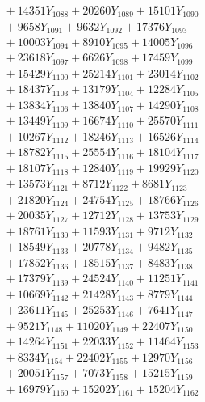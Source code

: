 \documentclass[a4paper,10pt]{article}
\begin{document}
{\begin{align}
&\;  + 14351 Y_{1088} + 20260 Y_{1089} + 15101 Y_{1090} \\[0.3ex]
&\;  + 9658 Y_{1091} + 9632 Y_{1092} + 17376 Y_{1093} \\[0.3ex]
&\;  + 10003 Y_{1094} + 8910 Y_{1095} + 14005 Y_{1096} \\[0.3ex]
&\;  + 23618 Y_{1097} + 6626 Y_{1098} + 17459 Y_{1099} \\[0.3ex]
&\;  + 15429 Y_{1100} + 25214 Y_{1101} + 23014 Y_{1102} \\[0.3ex]
&\;  + 18437 Y_{1103} + 13179 Y_{1104} + 12284 Y_{1105} \\[0.3ex]
&\;  + 13834 Y_{1106} + 13840 Y_{1107} + 14290 Y_{1108} \\[0.5ex]\allowbreak
&\;  + 13449 Y_{1109} + 16674 Y_{1110} + 25570 Y_{1111} \\[0.3ex]
&\;  + 10267 Y_{1112} + 18246 Y_{1113} + 16526 Y_{1114} \\[0.3ex]
&\;  + 18782 Y_{1115} + 25554 Y_{1116} + 18104 Y_{1117} \\[0.3ex]
&\;  + 18107 Y_{1118} + 12840 Y_{1119} + 19929 Y_{1120} \\[0.3ex]
&\;  + 13573 Y_{1121} + 8712 Y_{1122} + 8681 Y_{1123} \\[0.3ex]
&\;  + 21820 Y_{1124} + 24754 Y_{1125} + 18766 Y_{1126} \\[0.3ex]
&\;  + 20035 Y_{1127} + 12712 Y_{1128} + 13753 Y_{1129} \\[0.3ex]
&\;  + 18761 Y_{1130} + 11593 Y_{1131} + 9712 Y_{1132} \\[0.3ex]
&\;  + 18549 Y_{1133} + 20778 Y_{1134} + 9482 Y_{1135} \\[0.3ex]
&\;  + 17852 Y_{1136} + 18515 Y_{1137} + 8483 Y_{1138} \\[0.5ex]\allowbreak
&\;  + 17379 Y_{1139} + 24524 Y_{1140} + 11251 Y_{1141} \\[0.3ex]
&\;  + 10669 Y_{1142} + 21428 Y_{1143} + 8779 Y_{1144} \\[0.3ex]
&\;  + 23611 Y_{1145} + 25253 Y_{1146} + 7641 Y_{1147} \\[0.3ex]
&\;  + 9521 Y_{1148} + 11020 Y_{1149} + 22407 Y_{1150} \\[0.3ex]
&\;  + 14264 Y_{1151} + 22033 Y_{1152} + 11464 Y_{1153} \\[0.3ex]
&\;  + 8334 Y_{1154} + 22402 Y_{1155} + 12970 Y_{1156} \\[0.3ex]
&\;  + 20051 Y_{1157} + 7073 Y_{1158} + 15215 Y_{1159} \\[0.3ex]
&\;  + 16979 Y_{1160} + 15202 Y_{1161} + 15204 Y_{1162} \\[0.3ex]

\end{align}}
\end{document}

